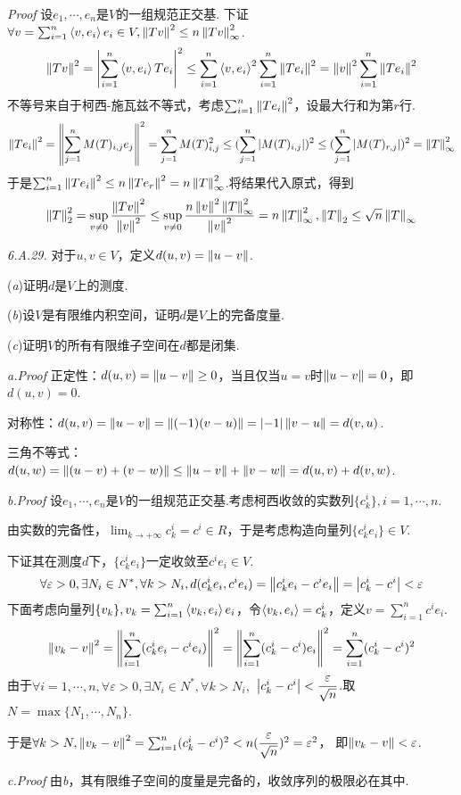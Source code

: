 \textit{Proof}
设\(e_1,\cdots,e_n\)是\(V\)的一组规范正交基.
下证\(\forall v=\sum_{i=1}^n \left\langle v,e_i \right\rangle e_i \in V,\left\lVert Tv \right\rVert^2 \leq n \left\lVert Tv \right\rVert_{\infty}^2\).
    \begin{align*}
        \left\lVert Tv \right\rVert^2=\left\lvert \sum_{i=1}^n \left\langle v,e_i \right\rangle Te_i \right\rvert^2 \leq \sum_{i=1}^n \left\langle v,e_i \right\rangle^2 \sum_{i=1}^n \left\lVert Te_i \right\rVert^2 
        =\left\lVert v \right\rVert^2 \sum_{i=1}^n \left\lVert Te_i \right\rVert^2
    \end{align*}
不等号来自于柯西-施瓦兹不等式，考虑\(\sum_{i=1}^n \left\lVert Te_i \right\rVert^2\)，设最大行和为第\(r\)行.
    \begin{align*}
        \left\lVert Te_i \right\rVert^2=\left\lVert \sum_{j=1}^n M(T)_{i,j}e_j \right\rVert^2=\sum_{j=1}^n M(T)_{i,j}^2
        \leq (\sum_{j=1}^n \left\lvert M(T)_{i,j} \right\rvert)^2 \leq (\sum_{j=1}^n \left\lvert M(T)_{r,j} \right\rvert)^2=\left\lVert T \right\rVert_{\infty}^2
    \end{align*}
于是\(\sum_{i=1}^n \left\lVert Te_i \right\rVert^2 \leq n\left\lVert Te_r \right\rVert^2=n\left\lVert T \right\rVert_{\infty}^2\).将结果代入原式，得到
    \begin{align*}
        \left\lVert T \right\rVert_2^2=\sup_{v \ne 0} \dfrac{\left\lVert Tv \right\rVert^2}{\left\lVert v \right\rVert^2} 
        \leq \sup_{v \ne 0} \dfrac{n \left\lVert v \right\rVert^2 \left\lVert T \right\rVert_{\infty}^2}{\left\lVert v \right\rVert^2}=n \left\lVert T \right\rVert_{\infty}^2,
        \left\lVert T \right\rVert_2 \leq \sqrt{n}\left\lVert T \right\rVert_{\infty}
    \end{align*}

\hspace*{\fill}

\textit{6.A.29.}
对于\(u,v \in V\)，定义\(d(u,v)=\left\lVert u-v \right\rVert\).

(\textit{a})证明\(d\)是\(V\)上的测度.

(\textit{b})设\(V\)是有限维内积空间，证明\(d\)是\(V\)上的完备度量.

(\textit{c})证明\(V\)的所有有限维子空间在\(d\)都是闭集.

\textit{a.Proof}
正定性：\(d(u,v)=\left\lVert u-v \right\rVert \geq 0\)，当且仅当\(u=v\)时\(\left\lVert u-v \right\rVert=0\)，即\(d(u,v)=0\).

对称性：\(d(u,v)=\left\lVert u-v \right\rVert=\left\lVert (-1)(v-u) \right\rVert=\left\lvert -1 \right\rvert\left\lVert v-u \right\rVert=d(v,u)\).

三角不等式：\(d(u,w)=\left\lVert (u-v)+(v-w) \right\rVert \leq \left\lVert u-v \right\rVert+\left\lVert v-w \right\rVert=d(u,v)+d(v,w)\).

\textit{b.Proof}
设\(e_1,\cdots,e_n\)是\(V\)的一组规范正交基.考虑柯西收敛的实数列\(\{c_k^i\},i=1,\cdots,n\).

由实数的完备性，\(\lim_{k \rightarrow +\infty}c_k^i=c^i \in R\)，于是考虑构造向量列\(\{c_k^ie_i\} \in V\).

下证其在测度\(d\)下，\(\{c_k^ie_i\}\)一定收敛至\(c^ie_i \in V\).
    \begin{align*}
        \forall \varepsilon>0,\exists N_i \in N^*,\forall k>N_i,
        d(c_k^ie_i,c^ie_i)=\left\lVert c_k^ie_i-c^ie_i \right\rVert=\left\lvert c_k^i-c^i \right\rvert<\varepsilon
    \end{align*}
下面考虑向量列\(\{v_k\},v_k=\sum_{i=1}^n \left\langle v_k,e_i \right\rangle e_i\)，令\(\left\langle v_k,e_i \right\rangle=c_k^i\)，定义\(v=\sum_{i=1}^n c^ie_i\).
    \begin{align*}
        \left\lVert v_k-v \right\rVert^2=\left\lVert \sum_{i=1}^n(c_k^ie_i-c^ie_i) \right\rVert^2=\left\lVert \sum_{i=1}^n(c_k^i-c^i)e_i \right\rVert^2
        =\sum_{i=1}^n(c_k^i-c^i)^2
    \end{align*}
由于\(\forall i=1,\cdots,n,\forall \varepsilon>0,\exists N_i \in N^*,\forall k>N_i,\)
\(\left\lvert c_k^i-c^i \right\rvert<\dfrac{\varepsilon}{\sqrt{n}}\).取\(N=\max\{N_1,\cdots,N_n\}\).

于是\(\forall k>N,\left\lVert v_k-v \right\rVert^2=\sum_{i=1}^n(c_k^i-c^i)^2<n(\dfrac{\varepsilon}{\sqrt{n}})^2=\varepsilon^2\)，
即\(\left\lVert v_k-v \right\rVert<\varepsilon\).

\textit{c.Proof}
由\textit{b}，其有限维子空间的度量是完备的，收敛序列的极限必在其中.

